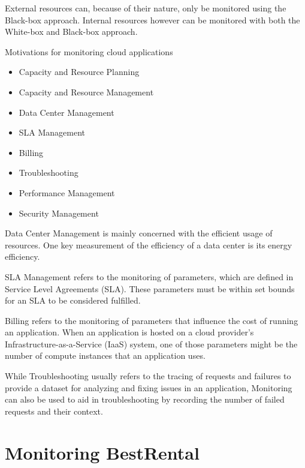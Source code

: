 External resources can, because of their nature, only be monitored using the Black-box approach.
Internal resources however can be monitored with both the White-box and Black-box approach.

Motivations for monitoring cloud applications \cite{6483656}
\begin{itemize}
    \item Capacity and Resource Planning
    \item Capacity and Resource Management
    \item Data Center Management
    \item SLA Management
    \item Billing
    \item Troubleshooting
    \item Performance Management
    \item Security Management
\end{itemize}



Data Center Management is mainly concerned with the efficient usage of resources.
One key measurement of the efficiency of a data center is its energy efficiency.

SLA Management refers to the monitoring of parameters, which are defined in Service Level Agreements (SLA).
These parameters must be within set bounds for an SLA to be considered fulfilled.

Billing refers to the monitoring of parameters that influence the cost of running an application.
When an application is hosted on a cloud provider's Infrastructure-as-a-Service (IaaS) system,
one of those parameters might be the number of compute instances that an application uses.

While Troubleshooting usually refers to the tracing of requests and failures to provide a dataset for analyzing and fixing issues in an application,
Monitoring can also be used to aid in troubleshooting by recording the number of failed requests and their context.



\section{Monitoring BestRental}

